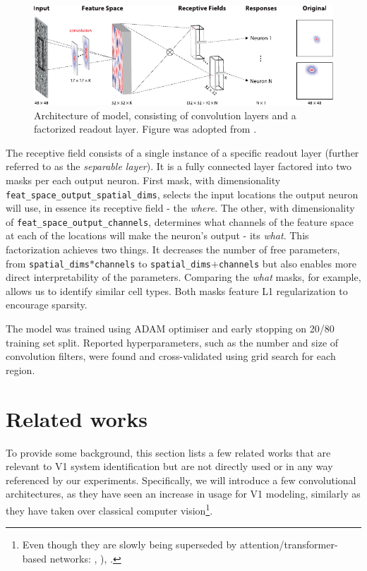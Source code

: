 \begin{figure}[h]
    \centering
    \includegraphics[width=1\textwidth]{../figures/02_fig2_A2u}
    \caption[klindt et al. model]{Architecture of \citeauthor{klindt} model, consisting of convolution layers and a factorized readout layer. Figure was adopted from \citep{klindt}.}
    \label{fig:2.2}
\end{figure}

The receptive field consists of a single instance of a specific readout layer (further referred to as the \textit{separable layer}). It is a fully connected layer factored into two masks per each output neuron. First mask, with dimensionality \texttt{feat\_space\_output\_spatial\_dims}, selects the input locations the output neuron will use, in essence its receptive field - the \textit{where}. The other, with dimensionality of \texttt{feat\_space\_output\_channels}, determines what channels of the feature space at each of the locations will make the neuron’s output - its \textit{what}. This factorization achieves two things. It decreases the number of free parameters, from \texttt{spatial\_dims}$*$\texttt{channels} to \texttt{spa\-tial\_dims}$+$\texttt{channels} but also enables more direct interpretability of the parameters. Comparing the \textit{what} masks, for example, allows us to identify similar cell types. Both masks feature L1 regularization to encourage sparsity.

The model was trained using ADAM optimiser and early stopping on 20/80 training set split. Reported hyperparameters, such as the number and size of convolution filters, were found and cross-validated using grid search for each region.

\section{Related works}\label{ch:2.3}
To provide some background, this section lists a few related works that are relevant to V1 system identification but are not directly used or in any way referenced by our experiments. Specifically, we will introduce a few convolutional architectures, as they have seen an increase in usage for V1 modeling, similarly as they have taken over classical computer vision\footnote{Even though they are slowly being superseded by attention/transformer-based networks: \citep{2019arXiv190605909R}, \citep{2019arXiv190409925B}), \citep{dosovitskiy2020image}.}.

